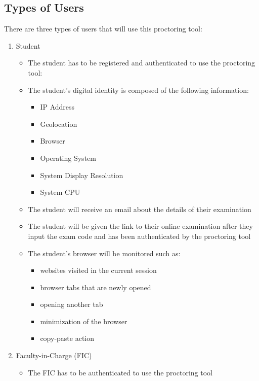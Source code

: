 \documentclass{icsthesis}
\begin{document}
\begin{mainmatter}
\subsection{Types of Users}
There are three types of users that will use this proctoring tool: 
\begin{enumerate}
    \item Student
        \begin{itemize}
            \item The student has to be registered and authenticated to use the proctoring tool: 
            \item The student's digital identity is composed of the following information:
                \begin{itemize}
                    \item IP Address
                    \item Geolocation
                    \item Browser
                    \item Operating System
                    \item System Display Resolution
                    \item System CPU
                \end{itemize}
            \item  The student will receive an email about the details of their examination
            \item The student will be given the link to their online examination after they input the exam code and has been authenticated by the proctoring tool
            \item The student's browser will be monitored such as:
                \begin{itemize}
                    \item websites visited in the current session 
                    \item browser tabs that are newly opened
                    \item opening another tab 
                    \item minimization of the browser 
                    \item copy-paste action 
                \end{itemize}
        \end{itemize}
    \item Faculty-in-Charge (FIC)
     \begin{itemize}
            \item The FIC has to be authenticated to use the proctoring tool

\end{itemize}
\end{enumerate}
\end{mainmatter}
\end{document}
